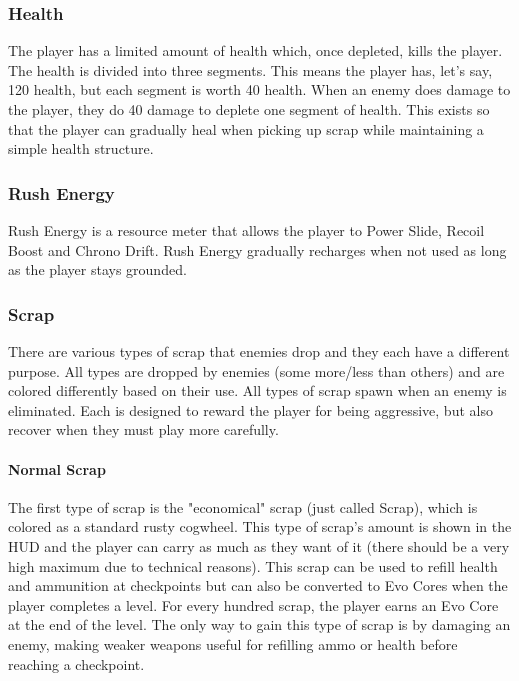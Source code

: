 \documentclass[12pt]{article}
\begin{document}
\subsubsection{Health}

The player has a limited amount of health which, once depleted, kills the player. The health is divided into three segments. This means the player has, let's say, 120 health, but each segment is worth 40 health. When an enemy does damage to the player, they do 40 damage to deplete one segment of health. This exists so that the player can gradually heal when picking up scrap while maintaining a simple health structure. 

\subsubsection{Rush Energy}

Rush Energy is a resource meter that allows the player to Power Slide, Recoil Boost and Chrono Drift. Rush Energy gradually recharges when not used as long as the player stays grounded. 

\subsubsection{Scrap}

There are various types of scrap that enemies drop and they each have a different purpose. All types are dropped by enemies (some more/less than others) and are colored differently based on their use. All types of scrap spawn when an enemy is eliminated. Each is designed to reward the player for being aggressive, but also recover when they must play more carefully. 

\paragraph{Normal Scrap}

The first type of scrap is the "economical" scrap (just called Scrap), which is colored as a standard rusty cogwheel. This type of scrap's amount is shown in the HUD and the player can carry as much as they want of it (there should be a very high maximum due to technical reasons). This scrap can be used to refill health and ammunition at checkpoints but can also be converted to Evo Cores when the player completes a level. For every hundred scrap, the player earns an Evo Core at the end of the level. The only way to gain this type of scrap is by damaging an enemy, making weaker weapons useful for refilling ammo or health before reaching a checkpoint. 
\end{document}
